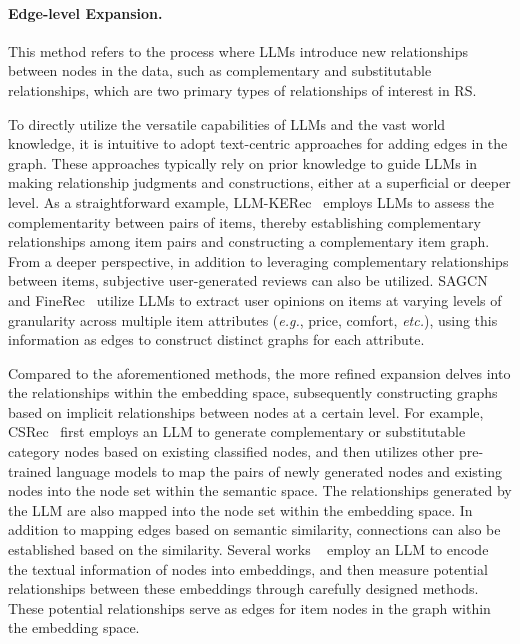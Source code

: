 \paragraph{Edge-level Expansion.}
This method refers to the process where LLMs introduce new relationships between nodes in the data, such as complementary and substitutable relationships, which are two primary types of relationships of interest in RS.

To directly utilize the versatile capabilities of LLMs and the vast world knowledge, it is intuitive to adopt text-centric approaches for adding edges in the graph. These approaches typically rely on prior knowledge to guide LLMs in making relationship judgments and constructions, either at a superficial or deeper level. As a straightforward example, LLM-KERec~\cite{zhao2024breaking} employs LLMs to assess the complementarity between pairs of items, thereby establishing complementary relationships among item pairs and constructing a complementary item graph. From a deeper perspective, in addition to leveraging complementary relationships between items, subjective user-generated reviews can also be utilized. SAGCN~\cite{liu2023understanding} and FineRec~\cite{zhang2024finerec} utilize LLMs to extract user opinions on items at varying levels of granularity across multiple item attributes (\textit{e.g.}, price, comfort, \textit{etc.}), using this information as edges to construct distinct graphs for each attribute.

Compared to the aforementioned methods, the more refined expansion delves into the relationships within the embedding space, subsequently constructing graphs based on implicit relationships between nodes at a certain level. For example, CSRec~\cite{yang2024common} first employs an LLM to generate complementary or substitutable category nodes based on existing classified nodes, and then utilizes other pre-trained language models to map the pairs of newly generated nodes and existing nodes into the node set within the semantic space. The relationships generated by the LLM are also mapped into the node set within the embedding space. In addition to mapping edges based on semantic similarity, connections can also be established based on the similarity. Several works ~\cite{yang2024sequential,cui2024comprehending} employ an LLM to encode the textual information of nodes into embeddings, and then measure potential relationships between these embeddings through carefully designed methods. These potential relationships serve as edges for item nodes in the graph within the embedding space.

